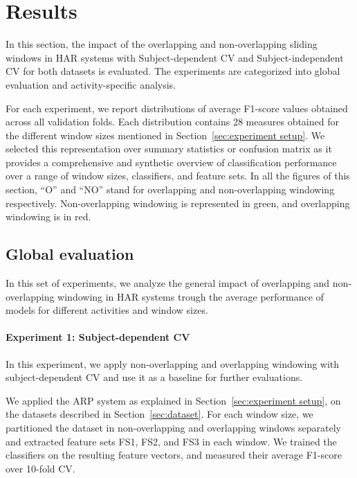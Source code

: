 \chapter{Results}\label{chap:result}
In this section, the impact of the overlapping and non-overlapping sliding windows in HAR systems with Subject-dependent CV and Subject-independent CV for both datasets is evaluated. The experiments are categorized into global evaluation and activity-specific analysis. 


For each experiment, we report distributions of average F1-score values obtained across all validation folds. Each distribution contains 28 measures obtained for the different window sizes mentioned in Section~\ref{sec:experiment setup}. We selected this representation over 
summary statistics or confusion matrix as it provides a comprehensive and synthetic overview of classification performance over a range of window sizes, classifiers, and feature sets.
In all the figures of this section, “O” and “NO” stand for overlapping and non-overlapping windowing respectively. Non-overlapping windowing is represented in green, and overlapping windowing is in red.    
\section{Global evaluation}\label{global_evaluation}
In this set of experiments, we analyze the general impact of overlapping and non-overlapping windowing in HAR systems trough the average performance of models for different activities and window sizes. 
\subsubsection{Experiment 1: Subject-dependent CV} \label{sec:ex1}
In this experiment, we apply non-overlapping and overlapping windowing with subject-dependent CV and use it as a baseline
for further evaluations. 

We applied the ARP system as explained in Section~\ref{sec:experiment setup}, on the datasets described in Section~\ref{sec:dataset}. For each window size, we partitioned the dataset in non-overlapping and overlapping windows separately and extracted feature sets FS1, FS2, and FS3 in each window. We trained the classifiers on the resulting feature vectors, and measured their average F1-score over 10-fold CV.

